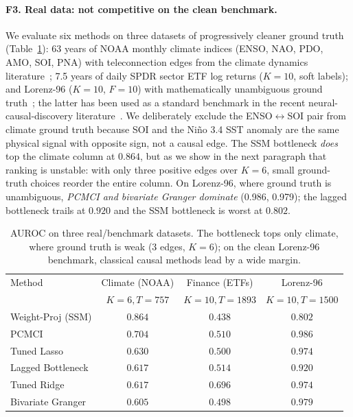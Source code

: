 \documentclass{article}
\begin{document}
\paragraph{F3. Real data: not competitive on the clean benchmark.} We
evaluate six methods on three datasets of progressively cleaner ground
truth (Table~\ref{tab:real}): 63 years of NOAA monthly climate indices
(ENSO, NAO, PDO, AMO, SOI, PNA) with teleconnection edges from the
climate dynamics literature~\citep{trenberth1994decadal,delworth2000observed,newman2016pdo};
7.5 years of daily SPDR sector ETF log returns ($K{=}10$, soft labels);
and Lorenz-96 ($K{=}10$, $F{=}10$) with mathematically unambiguous
ground truth~\citep{lorenz1996predictability}; the latter has been used
as a standard benchmark in the recent neural-causal-discovery
literature~\citep{tank2021neural,nauta2019causal}. We deliberately
exclude the ENSO$\leftrightarrow$SOI pair from climate ground truth
because SOI and the Niño 3.4 SST anomaly are the same physical signal
with opposite sign, not a causal edge. The SSM bottleneck \emph{does}
top the climate column at $0.864$, but as we show in the next paragraph
that ranking is unstable: with only three positive edges over $K{=}6$,
small ground-truth choices reorder the entire column. On Lorenz-96,
where ground truth is unambiguous, \emph{PCMCI and bivariate Granger
dominate} (0.986, 0.979); the lagged bottleneck trails at $0.920$ and
the SSM bottleneck is worst at $0.802$.

\begin{table}[t]
\centering
\small
\caption{AUROC on three real/benchmark datasets. The bottleneck tops only
climate, where ground truth is weak (3 edges, $K{=}6$); on the clean
Lorenz-96 benchmark, classical causal methods lead by a wide margin.}
\label{tab:real}
\begin{tabular}{lccc}
\toprule
Method & Climate (NOAA) & Finance (ETFs) & Lorenz-96 \\
 & $K{=}6, T{=}757$ & $K{=}10, T{=}1893$ & $K{=}10, T{=}1500$ \\
\midrule
Weight-Proj (SSM) & $\mathbf{0.864}$ & $0.438$ & $0.802$ \\
PCMCI & $0.704$ & $0.510$ & $\mathbf{0.986}$ \\
Tuned Lasso & $0.630$ & $0.500$ & $0.974$ \\
Lagged Bottleneck & $0.617$ & $0.514$ & $0.920$ \\
Tuned Ridge & $0.617$ & $\mathbf{0.696}$ & $0.974$ \\
Bivariate Granger & $0.605$ & $0.498$ & $0.979$ \\
\bottomrule
\end{tabular}
\end{table}
\end{document}
